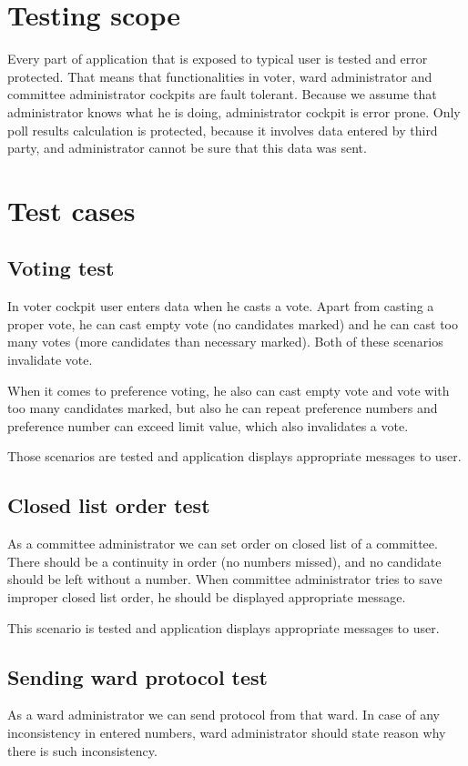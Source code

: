 \documentclass[a4paper,twoside,12pt]{book}
\begin{document}
  \section{Testing scope}
    Every part of application that is exposed to typical user is tested and error protected. 
    That means that functionalities in voter, ward administrator and committee administrator cockpits are fault tolerant.
    Because we assume that administrator knows what he is doing, administrator cockpit is error prone. 
    Only poll results calculation is protected, because it involves data entered by third party, and administrator cannot be sure that this data was sent.

  \section{Test cases}
    \subsection{Voting test}
      In voter cockpit user enters data when he casts a vote. Apart from casting a proper vote, he can cast empty vote (no candidates marked) and
      he can cast too many votes (more candidates than necessary marked). Both of these scenarios invalidate vote.

      When it comes to preference voting, he also can cast empty vote and vote with too many candidates marked, but also he can repeat preference numbers and
      preference number can exceed limit value, which also invalidates a vote.

      Those scenarios are tested and application displays appropriate messages to user.

    \subsection{Closed list order test}
      As a committee administrator we can set order on closed list of a committee.
      There should be a continuity in order (no numbers missed), and no candidate should be left without a number.
      When committee administrator tries to save improper closed list order, he should be displayed appropriate message.

      This scenario is tested and application displays appropriate messages to user.

    \subsection{Sending ward protocol test}
      As a ward administrator we can send protocol from that ward.
      In case of any inconsistency in entered numbers, ward administrator should state reason why there is such inconsistency.
\end{document}

